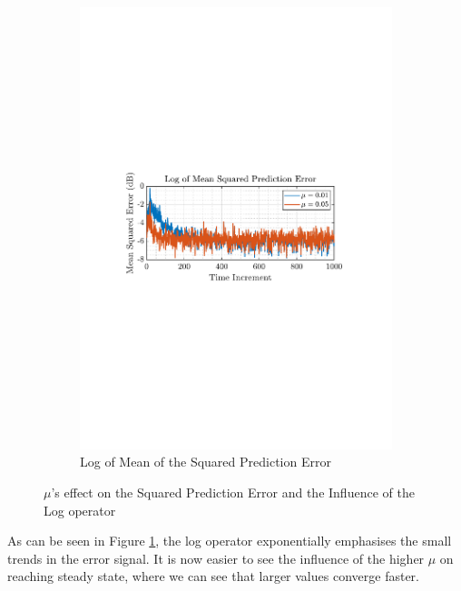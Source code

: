 \documentclass[12pt]{article}
\begin{document}
\begin{figure}[H]
				\begin{subfigure}{0.49\textwidth}
					\centering
					\includegraphics[trim={2.2cm 11.2cm 3.15cm  11.2cm}, clip, width=\textwidth]{../MATLAB/figures/q2_1b_fig03.pdf} 
					\captionsetup{justification=centering}
					\caption{Log of Mean of the Squared Prediction Error}
				\end{subfigure}
				\captionsetup{justification=centering}
				\caption{$\mu$'s effect on the Squared Prediction Error and the Influence of the Log operator}
				\label{fig: 2-1b}
			\end{figure}
		
		As can be seen in Figure \ref{fig: 2-1b}, the log operator exponentially emphasises the small trends in the error signal. It is now easier to see the influence of the higher $\mu$ on reaching steady state, where we can see that larger values converge faster.
		
\end{document}
